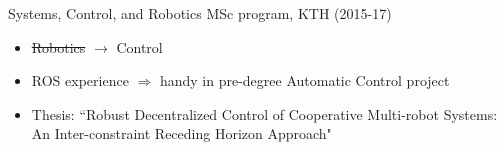\begin{frame}{Systems, Control, and Robotics MSc program, KTH (2015-17)}

  \begin{itemize}
    \item \sout{Robotics} $\rightarrow$ Control
    \item ROS experience $\Rightarrow$ handy in pre-degree Automatic Control project
    \item Thesis: ``Robust Decentralized Control of Cooperative Multi-robot Systems: An Inter-constraint Receding Horizon Approach"
  \end{itemize}

\end{frame}
